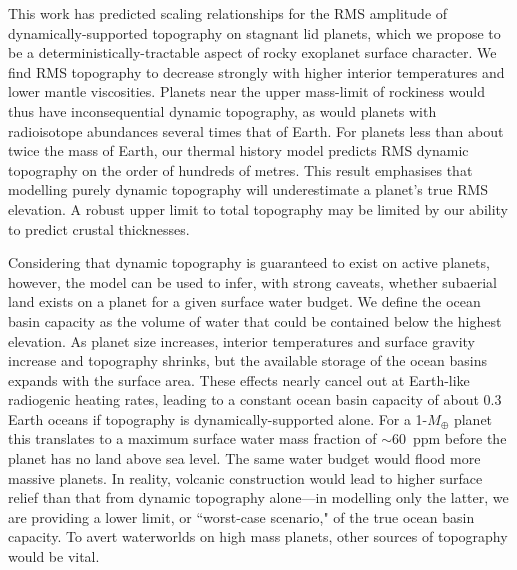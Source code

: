 This work has predicted scaling relationships for the RMS amplitude of dynamically-supported topography on stagnant lid planets, which we propose to be a deterministically-tractable aspect of rocky exoplanet surface character. We find RMS topography to decrease strongly with higher interior temperatures and lower mantle viscosities. Planets near the upper mass-limit of rockiness would thus have inconsequential dynamic topography, as would planets with radioisotope abundances several times that of Earth. For planets less than about twice the mass of Earth, our thermal history model predicts RMS dynamic topography on the order of hundreds of metres. This result emphasises that modelling purely dynamic topography will underestimate a planet's true RMS elevation. A robust upper limit to total topography may be limited by our ability to predict crustal thicknesses.

Considering that dynamic topography is guaranteed to exist on active planets, however, the model can be used to infer, with strong caveats, whether subaerial land exists on a planet for a given surface water budget. We define the ocean basin capacity as the volume of water that could be contained below the highest elevation. As planet size increases, interior temperatures and surface gravity increase and topography shrinks, but the available storage of the ocean basins expands with the surface area. These effects nearly cancel out at Earth-like radiogenic heating rates, leading to a constant ocean basin capacity of about 0.3 Earth oceans if topography is dynamically-supported alone. For a 1-$M_\oplus$ planet this translates to a maximum surface water mass fraction of $\sim$60~ppm before the planet has no land above sea level. The same water budget would flood more massive planets. In reality, volcanic construction would lead to higher surface relief than that from dynamic topography alone---in modelling only the latter, we are providing a lower limit, or ``worst-case scenario," of the true ocean basin capacity. To avert waterworlds on high mass planets, other sources of topography would be vital.





